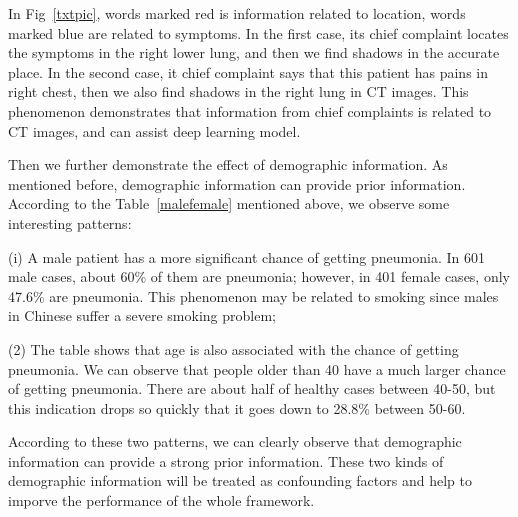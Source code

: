 \documentclass[journal]{IEEEtran}
\begin{document}
In Fig~\ref{txtpic}, words marked red is information related to location, words marked blue are related to symptoms. In the first case, its chief complaint locates the symptoms in the right lower lung, and then we find shadows in the accurate place. In the second case, it chief complaint says that this patient has pains in right chest, then we also find shadows in the right lung in CT images.
This phenomenon demonstrates that information from chief complaints is related to CT images, and can assist deep learning model.    

Then we further demonstrate the effect of demographic information. As mentioned before, demographic information can provide prior information. According to the Table~\ref{malefemale} mentioned above, we observe some interesting patterns:

(i) A male patient has a more significant chance of getting pneumonia. In 601 male cases, about 60\% of them are pneumonia; however, in 401 female cases, only 47.6\% are pneumonia. This phenomenon may be related to smoking since males in Chinese suffer a severe smoking problem; 

(2) The table shows that age is also associated with the chance of getting pneumonia. We can observe that people older than 40 have a much larger chance of getting pneumonia. There are about half of healthy cases between 40-50, but this indication drops so quickly that it goes down to 28.8\% between 50-60. 


According to these two patterns, we can clearly observe that demographic information can provide a strong prior information. These two kinds of demographic information will be treated as confounding factors and help to imporve the performance of the whole framework.
\end{document}

